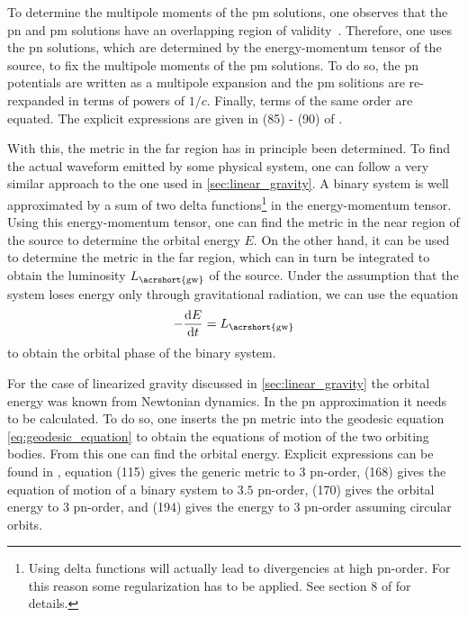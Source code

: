 To determine the multipole moments of the \acrshort{pm} solutions, one observes that the \acrshort{pn} and \acrshort{pm} solutions have an overlapping region of validity~\cite{Blanchet:2006aaa}. Therefore, one uses the \acrshort{pn} solutions, which are determined by the energy-momentum tensor of the source, to fix the multipole moments of the \acrshort{pm} solutions. To do so, the \acrshort{pn} potentials are written as a multipole expansion and the \acrshort{pm} solitions are re-rexpanded in terms of powers of $1/c$. Finally, terms of the same order are equated. The explicit expressions are given in (85) - (90) of \cite{Blanchet:2006aaa}.

With this, the metric in the far region has in principle been determined. To find the actual waveform emitted by some physical system, one can follow a very similar approach to the one used in \autoref{sec:linear_gravity}. A binary system is well approximated by a sum of two delta functions\footnote{Using delta functions will actually lead to divergencies at high \acrshort{pn}-order. For this reason some regularization has to be applied. See section 8 of \cite{Blanchet:2006aaa} for details.} in the energy-momentum tensor. Using this energy-momentum tensor, one can find the metric in the near region of the source to determine the orbital energy $E$. On the other hand, it can be used to determine the metric in the far region, which can in turn be integrated to obtain the luminosity $L_{\text{\acrshort{gw}}}$ of the source. Under the assumption that the system loses energy only through gravitational radiation, we can use the equation
\begin{equation}
-\frac{\diff E}{\diff t} = L_{\text{\acrshort{gw}}}
\end{equation}
to obtain the orbital phase of the binary system.

For the case of linearized gravity discussed in \autoref{sec:linear_gravity} the orbital energy was known from Newtonian dynamics. In the \acrshort{pn} approximation it needs to be calculated. To do so, one inserts the \acrshort{pn} metric into the geodesic equation \eqref{eq:geodesic_equation} to obtain the equations of motion of the two orbiting bodies. From this one can find the orbital energy. Explicit expressions can be found in \cite{Blanchet:2006aaa}, equation (115) gives the generic metric to $3$ \acrshort{pn}-order, (168) gives the equation of motion of a binary system to $3.5$ \acrshort{pn}-order, (170) gives the orbital energy to $3$ \acrshort{pn}-order, and (194) gives the energy to $3$ \acrshort{pn}-order assuming circular orbits.

